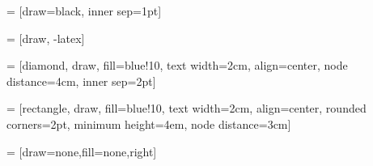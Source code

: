 \usepackage{tikz} %
\usetikzlibrary{shapes,decorations,arrows}
\usetikzlibrary{positioning}

 = [draw=black, inner sep=1pt]
\newlength{\fnodewidth} %
\setlength{\fnodewidth}{6cm}

 = [draw, -latex]

 = [diamond, draw, fill=blue!10, text width=2cm,
    align=center, node distance=4cm, inner sep=2pt]

 = [rectangle, draw, fill=blue!10, text width=2cm,
    align=center, rounded corners=2pt, minimum height=4em,
    node distance=3cm]
    
 = [draw=none,fill=none,right]


%
%
%
\newcommand{\funcnode}[4]{
    \node [funcnode, #1] (#2) {
        \begin{minipage}{\fnodewidth}
            \begin{tabular}{l}
                \rowcolor[gray]{0.8}
                \begin{minipage}[c]{\textwidth - 2\tabcolsep}
                    \singlespacing
                    \begin{center}
                        \vspace{-\baselineskip}
                        \textbf{#3}
                    \end{center}
                \end{minipage}\\
                \begin{minipage}[c]{\textwidth - 2\tabcolsep}
                    \singlespacing
                    \begin{minipage}[c]{\textwidth - 2\tabcolsep}
                    #4
                    \end{minipage}
                    \vspace{0.5\baselineskip}\\
                \end{minipage}\\
            \end{tabular}
        \end{minipage}
    } %
} %
